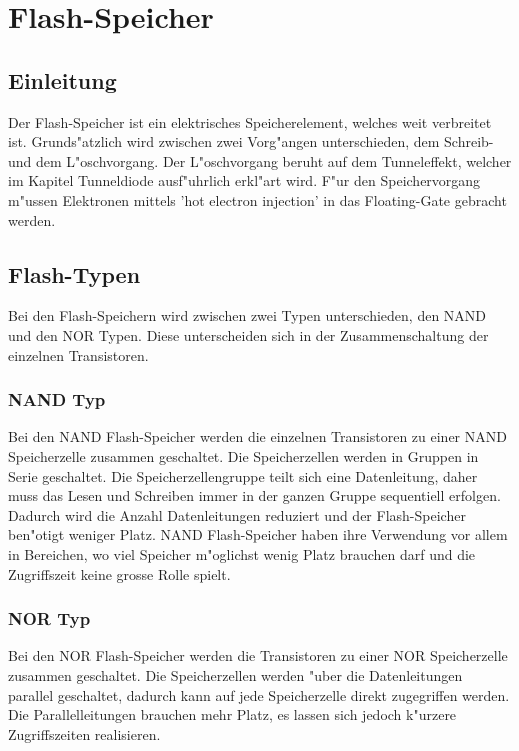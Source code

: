\chapter{Flash-Speicher\label{chapter:flash}}
\begin{refsection}

\newpage
\section{Einleitung}
Der Flash-Speicher ist ein elektrisches Speicherelement, welches weit verbreitet ist. Grunds"atzlich wird zwischen zwei Vorg"angen unterschieden, dem Schreib- und dem L"oschvorgang. Der L"oschvorgang beruht auf dem Tunneleffekt, welcher im Kapitel Tunneldiode ausf"uhrlich erkl"art wird. F"ur den Speichervorgang m"ussen Elektronen mittels 'hot electron injection' in das Floating-Gate gebracht werden. 

\section{Flash-Typen}
Bei den Flash-Speichern wird zwischen zwei Typen unterschieden, den NAND und den NOR Typen. Diese unterscheiden sich in der Zusammenschaltung der einzelnen Transistoren. 

\subsection{NAND Typ}
Bei den NAND Flash-Speicher werden die einzelnen Transistoren zu einer NAND Speicherzelle zusammen geschaltet. Die Speicherzellen werden in Gruppen in Serie geschaltet. Die Speicherzellengruppe teilt sich eine Datenleitung, daher muss das Lesen und Schreiben immer in der ganzen Gruppe sequentiell erfolgen. Dadurch wird die Anzahl Datenleitungen reduziert und der Flash-Speicher ben"otigt weniger Platz. NAND Flash-Speicher haben ihre Verwendung vor allem in Bereichen, wo viel Speicher m"oglichst wenig Platz brauchen darf und die Zugriffszeit keine grosse Rolle spielt.
\subsection{NOR Typ}
Bei den NOR Flash-Speicher werden die Transistoren zu einer NOR Speicherzelle zusammen geschaltet.
Die Speicherzellen werden "uber die Datenleitungen parallel geschaltet, dadurch kann auf jede Speicherzelle direkt zugegriffen werden. Die Parallelleitungen brauchen mehr Platz, es lassen sich jedoch k"urzere Zugriffszeiten realisieren.


\end{refsection}

